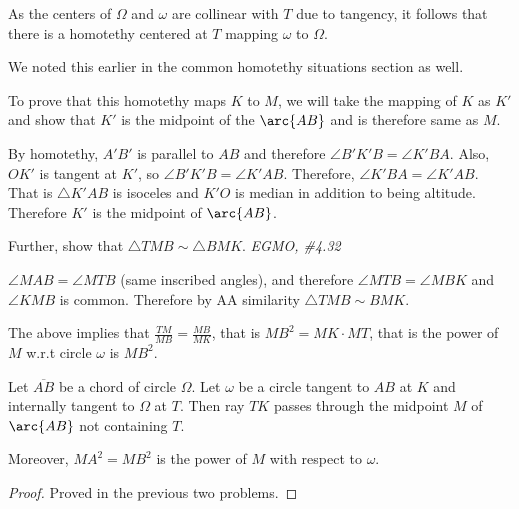 \documentclass[11pt,twoside]{scrartcl}
\begin{document}
\begin{soln}
    As the centers of $\Omega$ and $\omega$ are collinear with $T$ due to tangency, it follows that there is a homotethy centered at $T$ mapping $\omega$ to $\Omega$.

\begin{note}
    We noted this earlier in the common homotethy situations section as well.
\end{note}
    To prove that this homotethy maps $K$ to $M$, we will take the mapping of $K$ as $K'$ and show that $K'$ is the midpoint of the $\arc{AB}$ and is therefore same as $M$.

    By homotethy, $A'B'$ is parallel to $AB$ and therefore $\angle B'K'B = \angle K'BA$. Also, $OK'$ is tangent at $K'$, so $\angle B'K'B = \angle K'AB$. Therefore, $\angle K'BA = \angle K'AB$. That is $\triangle K'AB$ is isoceles and $K'O$ is median in addition to being altitude. Therefore $K'$ is the midpoint of $\arc{AB}$.
\end{soln}
\begin{problem}
    Further, show that $\triangle TMB \sim \triangle BMK$. \textit{\cite{echen} EGMO, \#4.32}
\end{problem}
\begin{soln}
    $\angle MAB = \angle MTB$ (same inscribed angles), and therefore $\angle MTB = \angle MBK $ and $\angle KMB$ is common. Therefore by AA similarity $ \triangle TMB \sim BMK$.
\end{soln}
\begin{remark}
    The above implies that $\frac{TM}{MB} = \frac{MB}{MK}$, that is $MB^2 = MK \cdot MT$, that is the power of $M$ w.r.t circle $\omega$ is $MB^2$.
\end{remark}

\begin{lemma}
    Let $\overline{AB}$ be a chord of circle $\Omega$. Let $\omega$ be a circle tangent to $AB$ at $K$ and internally tangent to $\Omega$ at $T$. Then ray $TK$ passes through the midpoint $M$ of $\arc{AB}$ not containing $T$. 

    Moreover, $MA^2 = MB^2$ is the power of $M$ with respect to $\omega$.
\end{lemma}
\begin{proof}
    Proved in the previous two problems.
\end{proof}
\end{document}
